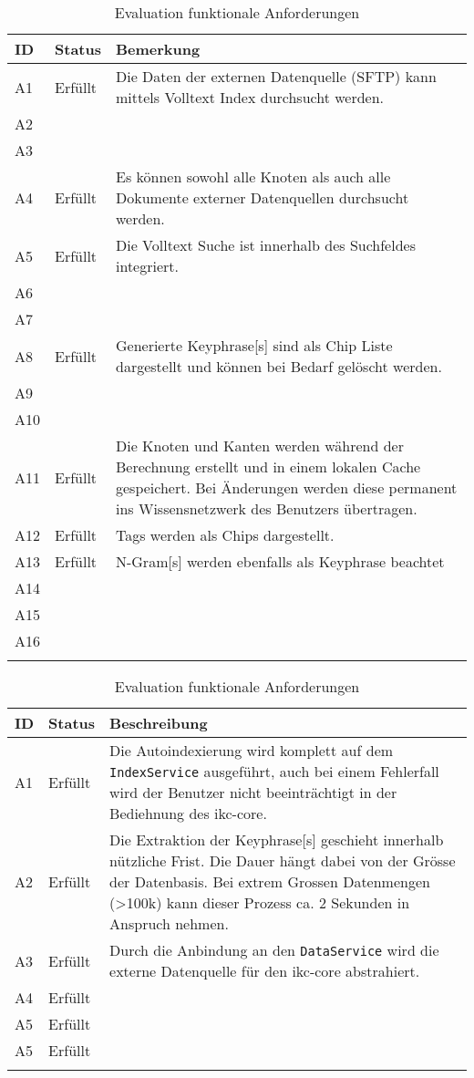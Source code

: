 \begin{longtable}{|p{1.5cm} | p{1.5cm} | p{8.1cm}|}
  \hline
    ID & Status & Bemerkung \\\hline
    A1 & Erfüllt & Die Daten der externen Datenquelle (SFTP) kann mittels Volltext Index durchsucht werden. \\\hline
    A2 &  & \\\hline
    A3 &  & \\\hline
    A4 & Erfüllt & Es können sowohl alle Knoten als auch alle Dokumente externer Datenquellen durchsucht werden. \\\hline
    A5 & Erfüllt & Die Volltext Suche ist innerhalb des Suchfeldes integriert. \\\hline
    A6 &  & \\\hline
    A7 &  & \\\hline
    A8 & Erfüllt & Generierte \gls{Keyphrase}[s] sind als Chip Liste dargestellt und können bei Bedarf gelöscht werden.\\\hline
    A9 &  & \\\hline
    A10 &  & \\\hline
    A11 & Erfüllt & Die Knoten und Kanten werden während der Berechnung erstellt und in einem lokalen Cache gespeichert. Bei Änderungen werden diese permanent ins Wissensnetzwerk des Benutzers übertragen.\\\hline
    A12 & Erfüllt & Tags werden als Chips dargestellt.\\\hline
    A13 & Erfüllt & \gls{N-Gram}[s] werden ebenfalls als \gls{Keyphrase} beachtet\\\hline
    A14 &  & \\\hline
    A15 &  & \\\hline
    A16 &  & \\\hline
    \caption{Evaluation funktionale Anforderungen}
  \label{tab:funktionale-anforderungen-eval}
\end{longtable}


\begin{longtable}{|p{1.5cm} | p{1.5cm} | p{8.1cm}|}
  \hline
    ID & Status & Beschreibung \\\hline
    A1 & Erfüllt & Die Autoindexierung wird komplett auf dem \texttt{IndexService} ausgeführt, auch bei einem Fehlerfall wird der Benutzer nicht beeinträchtigt in der Bediehnung des \gls{ikc-core}. \\\hline
    A2 & Erfüllt & Die Extraktion der \gls{Keyphrase}[s] geschieht innerhalb nützliche Frist. Die Dauer hängt dabei von der Grösse der Datenbasis. Bei extrem Grossen Datenmengen (>100k) kann dieser Prozess ca. 2 Sekunden in Anspruch nehmen.   \\\hline
    A3 & Erfüllt & Durch die Anbindung an den \texttt{DataService} wird die externe Datenquelle für den \gls{ikc-core} abstrahiert.\\\hline
    A4 & Erfüllt & \\\hline
    A5 & Erfüllt & \\\hline
    A5 & Erfüllt & \\\hline
    \caption{Evaluation funktionale Anforderungen}
  \label{tab:nicht-funktionale-anforderungen-eval}
\end{longtable}
